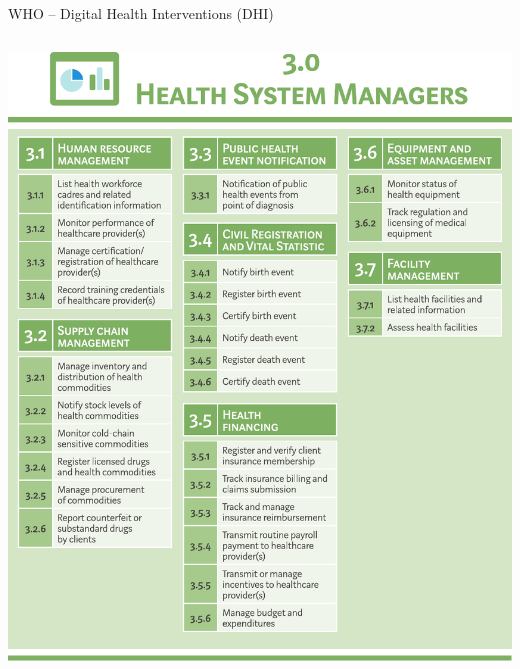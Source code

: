 \documentclass[aspectratio=1610,12pt]{beamer}
\begin{document}
\begin{frame}{WHO -- Digital Health Interventions (DHI)}
\begin{columns}
  \includegraphics[height=.8\textheight]{img/whodhi-managers.pdf}
\end{columns}
\end{frame}
\end{document}
